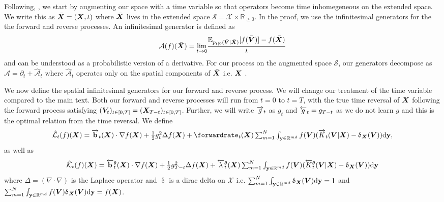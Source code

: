 Following, \citet{benton2022denoising}, we start by augmenting our space with a time variable so that operators become time inhomegeneous on the extended space. We write this as $\bar{{\bm{X}}} = ({\bm{X}}, t)$ where $\bar{{\bm{X}}}$ lives in the extended space $\mathcal{S} = \mathcal{X} \times \mathbb{R}_{\geq 0}$. In the proof, we use the infinitesimal generators for the the forward and reverse processes. An infinitesimal generator is defined as 
\begin{equation}
    \mathcal{A}(f)(\bar{{\bm{X}}}) = \underset{t \rightarrow 0}{\text{lim}} \frac{\mathbb{E}_{p_{t|0}(\bar{{\bm{V}}} | \bar{{\bm{X}}})} [ f(\bar{{\bm{V}}}) ] - f(\bar{{\bm{X}}}) }{t}
\end{equation}
and can be understood as a probabilistic version of a derivative. For our process on the augmented space $\mathcal{S}$, our generators decompose as $\mathcal{A} = \partial_t + \hat{\mathcal{A}}_t$ where $\hat{\mathcal{A}}_t$ operates only on the spatial components of $\bar{{\bm{X}}}$ i.e. ${\bm{X}}$ \citep{benton2022denoising}.


We now define the spatial infinitesimal generators for our forward and reverse process. We will change our treatment of the time variable compared to the main text. Both our forward and reverse processes will run from $t=0$ to $t=T$, with the true time reversal of ${\bm{X}}$ following the forward process satisfying $( {\bm{V}}_t)_{t \in [0, T]} = ({\bm{X}}_{T-t})_{t \in [0, T]}$. Further, we will write $\overrightarrow{g}_t$ as $g_t$ and $\overleftarrow{g}_t = g_{T-t}$ as we do not learn $g$ and this is the optimal relation from the time reversal. We define
\begin{equation}
\textstyle    \hat{\mathcal{L}}_t(f)(\mX) = \forwarddrift_t(\mX) \cdot \nabla f(\mX) + \frac{1}{2} g_t^2 \Delta f (\mX) + \forwardrate_t(\mX) \inty f(\mV) ( \ftk_t( \mV | \mX) - \updelta_{\mX}(\mV) ) \rmd\y ,
\end{equation}
as well as 
\begin{equation}
    \textstyle \hat{\mathcal{K}}_t(f)({\bm{X}}) = \overleftarrow{\mathbf{b}}_t^\theta({\bm{X}}) \cdot \nabla f({\bm{X}}) + \frac{1}{2} g_{T-t}^2 \Delta f ({\bm{X}}) + \overleftarrow{\lambda}_t^\theta({\bm{X}}) \sum_{m=1}^N \int_{\mathbf{y} \in \mathbb{R}^{md}} f({\bm{V}}) ( \overleftarrow{K}_t^\theta({\bm{V}} | {\bm{X}}) - \updelta_{{\bm{X}}}({\bm{V}}) ) \mathrm{d}\mathbf{y} 
\end{equation}
where $\Delta = (\nabla \cdot \nabla)$ is the Laplace operator and $\updelta$ is a dirac delta on $\mathcal{X}$ i.e. $\sum_{m=1}^N \int_{\mathbf{y} \in \mathbb{R}^{md}} \updelta_{{\bm{X}}}({\bm{V}}) \mathrm{d} \mathbf{y} = 1$ and $\sum_{m=1}^N \int_{\mathbf{y} \in \mathbb{R}^{md}} f({\bm{V}}) \updelta_{{\bm{X}}} ({\bm{V}}) \mathrm{d} \mathbf{y} = f({\bm{X}})$. 


